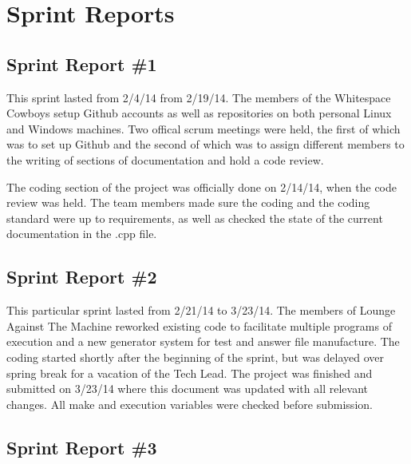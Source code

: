 
\chapter{Sprint Reports}

\section{Sprint Report \#1}

This sprint lasted from 2/4/14 from 2/19/14. The members of the Whitespace Cowboys setup Github 
accounts as well as repositories on both personal Linux and Windows machines. Two offical scrum 
meetings were held, the first of which was to set up Github and the second of which was to assign 
different members to the writing of sections of documentation and hold a code review. 

The coding section of the project was officially done on 2/14/14, when the code review was held. 
The team members made sure the coding and the coding standard were up to requirements, as well as
checked the state of the current documentation in the .cpp file. 

\section{Sprint Report \#2}

This particular sprint lasted from 2/21/14 to 3/23/14.  The members of Lounge Against The Machine reworked existing code to facilitate multiple programs of execution and a new generator system for test and answer file manufacture.  The coding started shortly after the beginning of the sprint, but was delayed over spring break for a vacation of the Tech Lead.  The project was finished and submitted on 3/23/14 where this document was updated with all relevant changes.  All make and execution variables were checked before submission.

\section{Sprint Report \#3}
